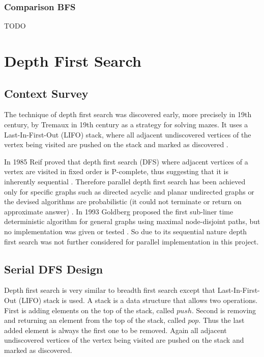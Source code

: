 \documentclass{report}
\theoremstyle{plain}
\theoremstyle{definition}
\theoremstyle{remark}
\begin{document}
\subsection{Comparison BFS}

TODO

\chapter{Depth First Search}

\section{Context Survey}

The technique of depth first search was discovered  early, more precisely in 19th century, by Tremaux in 19th century as a strategy for solving mazes. It uses a Last-In-First-Out (LIFO) stack, where all adjacent undiscovered vertices of the vertex being visited are pushed on the stack and marked as discovered \cite{c++_sedgewick}.

In 1985 Reif proved that depth first search (DFS) where adjacent vertices of a vertex are visited in fixed order is P-complete, thus suggesting that it is inherently sequential \cite{reif1985depth}. Therefore parallel depth first search has been achieved only for specific graphs such as directed acyclic \cite{ghosh1984parallel} and planar undirected graphs \cite{hagerup1990planar} or the devised algorithms are probabilistic (it could not terminate or return on approximate answer) \cite{aggarwal1989parallel}. In 1993 Goldberg proposed the first sub-liner time deterministic algorithm for general graphs using maximal node-disjoint paths, but no implementation was given or tested \cite{goldberg1993sublinear}. So due to its sequential nature depth first search was not further considered for parallel implementation in this project.

\section{Serial DFS Design}

Depth first search is very similar to breadth first search except that Last-In-First-Out (LIFO) stack is used. A stack is a data structure that allows two operations. First is adding elements on the top of the stack, called $push$. Second is removing and returning an element from the top of the stack, called $pop$. Thus the last added element is always the first one to be removed. Again all adjacent undiscovered vertices of the vertex being visited are pushed on the stack and marked as discovered.
\end{document}
